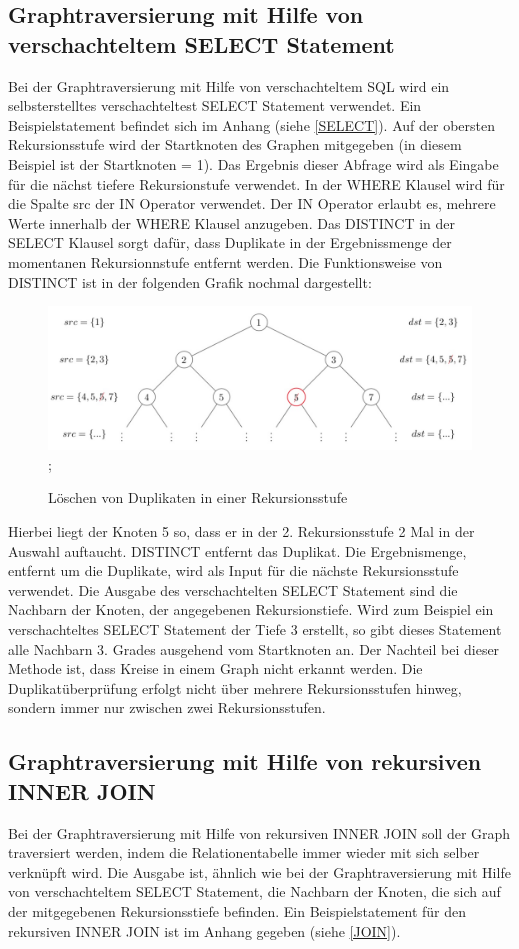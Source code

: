 \subsection{Graphtraversierung mit Hilfe von verschachteltem SELECT Statement}
Bei der Graphtraversierung mit Hilfe von verschachteltem \ac{SQL} wird ein selbsterstelltes verschachteltest SELECT Statement verwendet. Ein Beispielstatement
befindet sich im Anhang (siehe \ref{SELECT}). Auf der obersten Rekursionsstufe wird der Startknoten des Graphen mitgegeben (in diesem Beispiel ist der Startknoten = 1).
Das Ergebnis dieser Abfrage wird als Eingabe für die nächst tiefere Rekursionstufe verwendet. In der WHERE Klausel wird für die Spalte src der IN Operator verwendet.
Der IN Operator erlaubt es, mehrere Werte innerhalb der WHERE Klausel anzugeben. Das DISTINCT in der SELECT Klausel sorgt dafür, dass Duplikate in der Ergebnissmenge
der momentanen Rekursionnstufe entfernt werden. Die Funktionsweise von DISTINCT ist in der folgenden
Grafik nochmal dargestellt:
\begin{figure}[H]
    \includegraphics[width = \linewidth]{images/Distinct.jpg};
    \caption{Löschen von Duplikaten in einer Rekursionsstufe}
\end{figure}
Hierbei liegt der Knoten 5 so, dass er in der 2. Rekursionsstufe 2 Mal in der Auswahl auftaucht. DISTINCT entfernt das Duplikat. Die Ergebnismenge, entfernt um die
Duplikate, wird als Input für die nächste Rekursionsstufe verwendet.
Die Ausgabe des verschachtelten SELECT Statement sind die Nachbarn der Knoten, der angegebenen Rekursionstiefe. Wird zum Beispiel ein
verschachteltes SELECT Statement der Tiefe 3 erstellt, so gibt dieses Statement alle Nachbarn 3. Grades ausgehend vom Startknoten an. Der Nachteil bei dieser Methode ist, dass
Kreise in einem Graph nicht erkannt werden. Die Duplikatüberprüfung erfolgt nicht über mehrere Rekursionsstufen hinweg, sondern immer nur zwischen zwei Rekursionsstufen.

\subsection{Graphtraversierung mit Hilfe von rekursiven INNER JOIN}
Bei der Graphtraversierung mit Hilfe von rekursiven INNER JOIN soll der Graph traversiert werden, indem die Relationentabelle immer wieder mit sich selber verknüpft wird.
Die Ausgabe ist, ähnlich wie bei der Graphtraversierung mit Hilfe von verschachteltem SELECT Statement, die Nachbarn der Knoten, die sich auf der mitgegebenen Rekursionsstiefe
befinden. Ein Beispielstatement für den rekursiven INNER JOIN ist im Anhang gegeben (siehe \ref{JOIN}).


